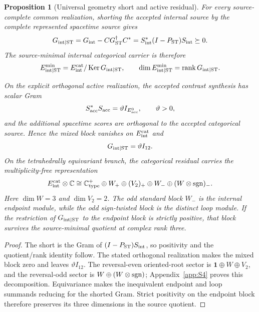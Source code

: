 \documentclass[11pt]{article}
\numberwithin{equation}{section}
\newtheorem{proposition}[theorem]{Proposition}
\theoremstyle{definition}
\theoremstyle{remark}
\newcommand{\C}{\mathbb C}
\newcommand{\rank}{\operatorname{rank}}
\newcommand{\Ker}{\operatorname{Ker}}
\begin{document}
\begin{proposition}[Universal geometry short and active residual]
\label{thm:geometry-short}
For every source-complete common realization, shorting the accepted internal
source by the complete represented spacetime source gives
\begin{equation}
G_{{\rm int}\mid{\rm ST}}
=
G_{\rm int}-CG_{\rm ST}^{\dagger}C^*
=
S_{\rm int}^*(I-P_{\rm ST})S_{\rm int}
\succeq0.
\label{eq:geometry-short-general}
\end{equation}
The source-minimal internal categorical carrier is therefore
\begin{equation}
E_{{\rm int}\mid{\rm ST}}^{\min}
=
E_{\rm int}^{\rm cat}/\Ker G_{{\rm int}\mid{\rm ST}},
\qquad
\dim E_{{\rm int}\mid{\rm ST}}^{\min}
=
\rank G_{{\rm int}\mid{\rm ST}}.
\label{eq:geometry-short-quotient}
\end{equation}

On the explicit orthogonal active realization, the accepted contrast synthesis
has scalar Gram
\[
S_{\rm acc}^*S_{\rm acc}=\vartheta I_{E_{\rm acc}^0},
\qquad \vartheta>0,
\]
and the additional spacetime scores are orthogonal to the accepted categorical
source.  Hence the mixed block vanishes on $E_{\rm int}^{\rm cat}$ and
\begin{equation}
G_{{\rm int}\mid{\rm ST}}=\vartheta I_{12}.
\label{eq:geometry-short}
\end{equation}
On the tetrahedrally equivariant branch, the categorical residual carries the
multiplicity-free representation
\begin{equation}
E_{\rm int}^{\rm cat}\otimes\C
\cong
\C_{\rm type}^{+}
\oplus W_+
\oplus(V_2)_+
\oplus W_-
\oplus(W\otimes{\rm sgn})_-.
\label{eq:residual-S4}
\end{equation}
Here $\dim W=3$ and $\dim V_2=2$.  The odd standard block $W_-$ is the
internal endpoint module, while the odd sign-twisted block is the distinct loop
module.  If the restriction of $G_{{\rm int}\mid{\rm ST}}$ to the endpoint
block is strictly positive, that block survives the source-minimal quotient at
complex rank three.
\end{proposition}

\begin{proof}
The short is the Gram of $(I-P_{\rm ST})S_{\rm int}$, so positivity and the
quotient/rank identity follow.  The stated orthogonal realization makes the
mixed block zero and leaves $\vartheta I_{12}$.  The reversal-even oriented-root
sector is $\mathbf1\oplus W\oplus V_2$, and the reversal-odd sector is
$W\oplus(W\otimes{\rm sgn})$; Appendix~\ref{app:S4} proves this decomposition.
Equivariance makes the inequivalent endpoint and loop summands reducing for
the shorted Gram.  Strict positivity on the endpoint block therefore
preserves its three dimensions in the source quotient.
\end{proof}
\end{document}
